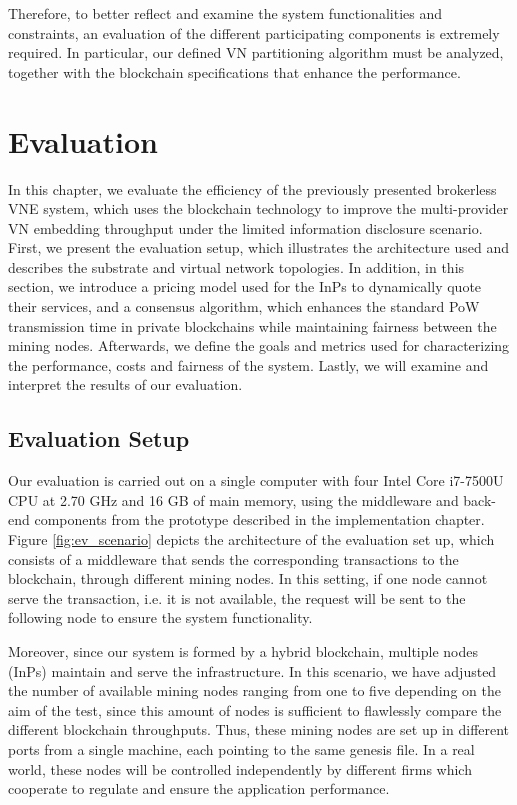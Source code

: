 Therefore, to better reflect and examine the system functionalities and constraints, an evaluation of the different participating components is extremely required. In particular, our defined VN partitioning algorithm must be analyzed, together with the blockchain specifications that enhance the performance.


\chapter{Evaluation}
\label{ch:evaluation}

In this chapter, we evaluate the efficiency of the previously presented brokerless VNE system, which uses the blockchain technology to improve the multi-provider VN embedding throughput under the limited information disclosure scenario. First, we present the evaluation setup, which illustrates the architecture used and describes the substrate and virtual network topologies. In addition, in this section, we introduce a pricing model used for the InPs to dynamically quote their services, and a consensus algorithm, which enhances the standard PoW transmission time in private blockchains while maintaining fairness between the mining nodes. Afterwards, we define the goals and metrics used for characterizing the performance, costs and fairness of the system. Lastly, we will examine and interpret the results of our evaluation.

\section{Evaluation Setup}

Our evaluation is carried out on a single computer with four Intel Core i7-7500U CPU at 2.70 GHz and 16 GB of main memory, using the middleware and back-end components from the prototype described in the implementation chapter. Figure \ref{fig:ev_scenario} depicts the architecture of the evaluation set up, which consists of a middleware that sends the corresponding transactions to the blockchain, through different mining nodes. In this setting, if one node cannot serve the transaction, i.e. it is not available, the request will be sent to the following node to ensure the system functionality.

Moreover, since our system is formed by a hybrid blockchain, multiple nodes (InPs) maintain and serve the infrastructure. In this scenario, we have adjusted the number of available mining nodes ranging from one to five depending on the aim of the test, since this amount of nodes is sufficient to flawlessly compare the different blockchain throughputs. Thus, these mining nodes are set up in different ports from a single machine, each pointing to the same genesis file. In a real world, these nodes will be controlled independently by different firms which cooperate to regulate and ensure the application performance.

